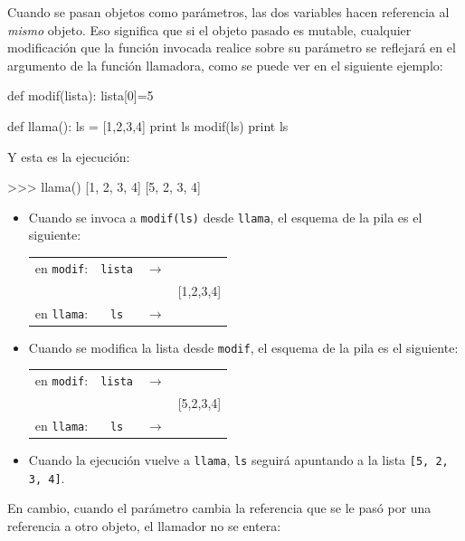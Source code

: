 Cuando se pasan objetos como parámetros, las dos variables hacen referencia al {\it mismo}
objeto. Eso significa que si el objeto pasado es mutable, cualquier modificación que
la función invocada realice sobre su parámetro se reflejará en el argumento de la función llamadora,
como se puede ver en el siguiente ejemplo:

\begin{codigo-python-sn}
def modif(lista):
    lista[0]=5

def llama():
    ls = [1,2,3,4]
    print ls
    modif(ls)
    print ls
\end{codigo-python-sn}

Y esta es la ejecución:
\begin{codigo-python-sn}
>>> llama()
[1, 2, 3, 4]
[5, 2, 3, 4]
\end{codigo-python-sn}

\begin{itemize}

\item Cuando se invoca a \lstinline|modif(ls)| desde \lstinline|llama|, el
esquema de la pila es
el siguiente:

\begin{tabular}{rcc|c|}
en \lstinline|modif|: &\lstinline!lista!& $\rightarrow$ & \\
                      &  &  & [1,2,3,4] \\
en \lstinline|llama|: &\lstinline!ls!& $\rightarrow$ & \\
\end{tabular}

\item Cuando se modifica la lista desde \lstinline|modif|, el esquema de la
pila es el siguiente:

\begin{tabular}{rcc|c|}
en \lstinline|modif|: &\lstinline!lista!& $\rightarrow$ & \\
                      &  &  & [5,2,3,4] \\
en \lstinline|llama|: &\lstinline!ls!& $\rightarrow$ & \\
\end{tabular}

\item Cuando la ejecución vuelve a \lstinline|llama|, \lstinline!ls!
seguirá apuntando a la lista \lstinline|[5, 2, 3, 4]|.

\end{itemize}

En cambio, cuando el parámetro cambia la referencia que se le pasó por una
referencia a otro objeto, el llamador no se entera:

